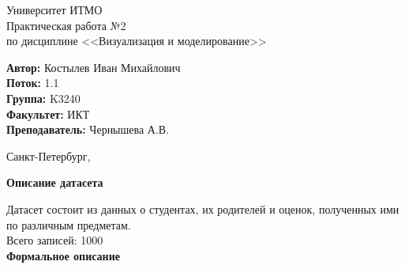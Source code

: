\documentclass[12pt,a4paper]{article}
\begin{document}
	
\begin{titlepage}
	
\begin{center}
	\large Университет ИТМО\\[5cm]
	\LARGE Практическая работа №2\\
	\normalsize по дисциплине <<Визуализация и моделирование>>\\[5cm]
\end{center}
\begin{flushright}
		\begin{minipage}{0.6\textwidth}
		\begin{flushleft}
			\large
			\singlespacing 
			\textbf{Автор:} Костылев Иван Михайлович\\
			\textbf{Поток:} 1.1\\
			\textbf{Группа:} K3240\\
			\textbf{Факультет:} ИКТ\\
			\textbf{Преподаватель:} Чернышева А.В.
		\end{flushleft}
	\end{minipage}
\end{flushright}

\vfill

\begin{center}
	{\large Санкт-Петербург, \the{}}
\end{center}
 
\end{titlepage}
\normalsize


\large \textbf{Описание датасета}

\normalsize
	Датасет состоит из данных о студентах, их родителей и оценок, полученных ими по различным предметам. \\

Всего записей: 1000 \\


\large \textbf{Формальное описание}
\end{document}
